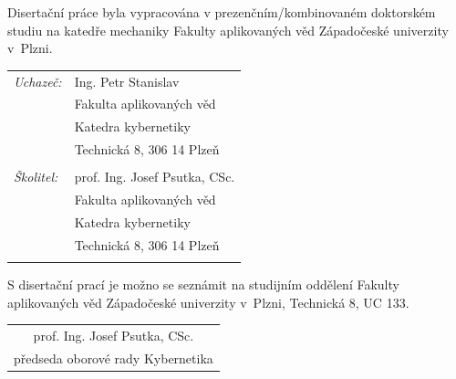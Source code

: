 \newpage

\thispagestyle{empty}
\noindent Disertační práce byla vypracována v prezenčním/kombinovaném doktorském studiu na katedře mechaniky Fakulty aplikovaných věd Západočeské univerzity v~Plzni. \\
\vspace{8mm}
\begin{flushleft}
  \begin{tabular}{ll}
     \textit{Uchazeč:}  & Ing. Petr Stanislav\\
                        & Fakulta aplikovaných věd\\
                        & Katedra kybernetiky\\
                        & Technická 8, 306 14 Plzeň\\
                        & \\
     \textit{Školitel:} & prof. Ing. Josef Psutka, CSc.\\
                        & Fakulta aplikovaných věd\\
                        & Katedra kybernetiky\\
                        & Technická 8, 306 14 Plzeň\\
                        & \\
\end{tabular}
\end{flushleft}
%
\vfill

\noindent S disertační prací je možno se seznámit na studijním oddělení
Fakulty aplikovaných věd Západočeské univerzity v~Plzni, Technická 8, UC 133. \\
\vspace{8mm}
\begin{flushright}
  \begin{tabular}{c}
   prof. Ing. Josef Psutka, CSc.\\
   předseda oborové rady Kybernetika
  \end{tabular}
\end{flushright}


\ifdefined\CELE
\else

\fi
